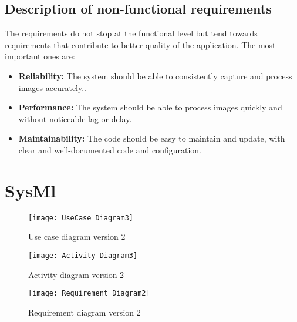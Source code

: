 \subsection{Description of non-functional requirements}
The requirements do not stop at the functional level but tend towards requirements that contribute to better quality of the application. The most important ones are:
\begin{itemize}
\item \textbf{Reliability:} The system should be able to consistently capture and process images accurately..
\item \textbf{Performance:} The system should be able to process images quickly and without noticeable lag or delay.
\item \textbf{Maintainability:} The code should be easy to maintain and update, with clear and well-documented code and configuration.
\end{itemize}

\section{SysMl}

\FloatBarrier
\begin{figure}[h]

         \centering
        \texttt{[image: UseCase Diagram3]}
   
        \caption{Use case diagram version 2}
        \label{Use case diagram version 2}

    \end{figure}


\FloatBarrier
\FloatBarrier
\begin{figure}[h]
\FloatBarrier
         \centering
        \texttt{[image: Activity Diagram3]}
   
        \caption{Activity diagram version 2}
        \label{Activity diagram version 2}
\FloatBarrier
    \end{figure}


\FloatBarrier

\FloatBarrier
\begin{figure}[h]
\FloatBarrier
         \centering
        \texttt{[image: Requirement Diagram2]}
   
        \caption{Requirement diagram version 2}
        \label{Requirement diagram version 2}
\FloatBarrier
    \end{figure}


